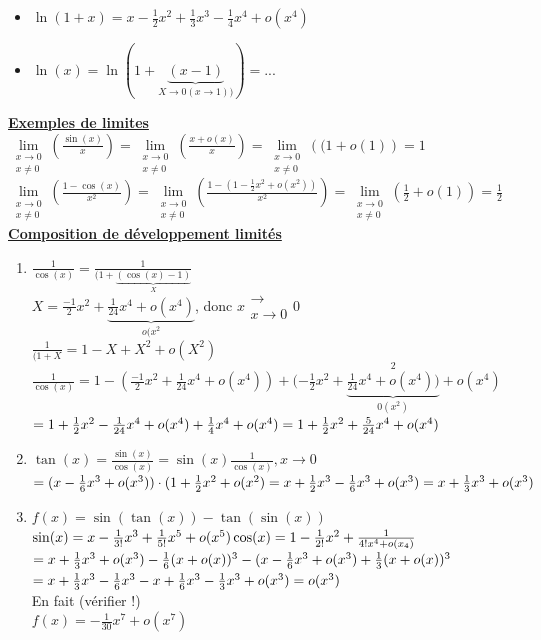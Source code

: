 \documentclass[12pt,a4paper]{article}
\newcommand{\limite}{\lim\limits_}
\newcommand{\llimite}[3]{\limite{\substack{#1 \\ #2}}\left(#3\right)}
\newcommand{\evid}[1]{\textbf{\underline{#1}}}
\begin{document}
{\begin{itemize}
	\item $\ln(1+x) = x-\frac{1}{2}x^2 + \frac{1}{3}x^3-\frac{1}{4}x^4+o(x^4)$
	\item $\ln(x) = \ln(1+\underbrace{(x-1)}_{X \to 0 (x\to 1))}) = ...$
\end{itemize}
\evid{Exemples de limites}
$\llimite{x\to 0}{x\neq 0}{\frac{\sin(x)}{x}}=\llimite{x\to 0}{x\neq 0}{\frac{x+o(x)}{x}}=\llimite{x\to 0}{x\neq 0}{(1+o(1)} = 1$\\
$\llimite{x\to 0}{x\neq 0}{\frac{1-\cos(x)}{x^2}} = \llimite{x\to 0}{x\neq 0}{\frac{1-(1-\frac{1}{2}x^2+o(x^2))}{x^2}} = \llimite{x\to 0}{x\neq 0}{\frac{1}{2}+o(1)} = \frac{1}{2}$
\evid{Composition de développement limités}\\
\begin{enumerate}
	\item $\frac{1}{\cos(x)} = \frac{1}{(1+\underbrace{(\cos(x)-1)}_{X}}$\\
	$X = \frac{-1}{2}x^2 + \underbrace{\frac{1}{24}x^4 + o(x^4)}_{o(x^2}$, donc $x\substack{\longrightarrow \\ x\to 0} 0$\\
	$\frac{1}{(1+X} = 1-X+X^2+o(X^2)$\\
	$\frac{1}{\cos(x)} = 1-(\frac{-1}{2}x^2 + \frac{1}{24}x^4 + o(x^4)) +(-\frac{1}{2}x^2+\underbrace{\frac{1}{24}x^4+o(x^4))}_{0(x^2)}^2+o(x^4)$\\
	$=1+\frac{1}{2}x^2 - \frac{1}{24}x^4 + o(x^4) + \frac{1}{4}x^4 + o(x^4)\\
	 = 1+\frac{1}{2}x^2 + \frac{5}{24}x^4 + o(x^4)$
	 \item $\tan(x) = \frac{\sin(x)}{\cos(x)} = \sin(x) \frac{1}{\cos(x)}, x\to 0$\\
	 $=(x-\frac{1}{6}x^3 + o(x^3))\cdot(1+\frac{1}{2}x^2 + o(x^2)\\
	 =x+\frac{1}{2}x^3 -\frac{1}{6}x^3 + o(x^3)\\
	 =x+\frac{1}{3}x^3 + o(x^3)$
	 \item $f(x) = \sin(\tan(x))-\tan(\sin(x))$\\
	 $\sin(x) = x-\frac{1}{3!}x^3 +\frac{1}{5!}x^5 + o(x^5)\\
	 \cos(x) = 1-\frac{1}{2!}x^2+\frac{1}{4!x^4+o(x_4)}$\\
	 $=x+\frac{1}{3}x^3 + o(x^3)-\frac{1}{6}(x+o(x))^3\\
	 -(x-\frac{1}{6}x^3+o(x^3) + \frac{1}{3}(x+o(x))^3$\\
	 $=x+\frac{1}{3}x^3 - \frac{1}{6}x^3 - x + \frac{1}{6} x^3 - \frac{1}{3}x^3+o(x^3)\\
	 = o(x^3)$\\
	 En fait (vérifier !)\\
	 $f(x) = -\frac{1}{30}x^7 + o(x^7)$
\end{enumerate}


}
\end{document}
